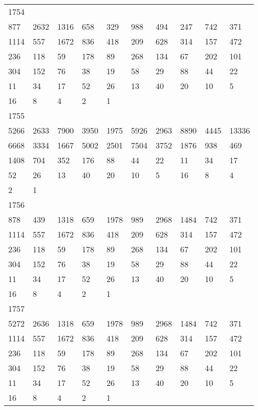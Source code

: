 \begin{longtable}{*{10}{l}}
1754&&&&&&&&&\\
877& 2632& 1316& 658& 329& 988& 494& 247& 742& 371\\
1114& 557& 1672& 836& 418& 209& 628& 314& 157& 472\\
236& 118& 59& 178& 89& 268& 134& 67& 202& 101\\
304& 152& 76& 38& 19& 58& 29& 88& 44& 22\\
11& 34& 17& 52& 26& 13& 40& 20& 10& 5\\
16& 8& 4& 2& 1& \\

1755&&&&&&&&&\\
5266& 2633& 7900& 3950& 1975& 5926& 2963& 8890& 4445& 13336\\
6668& 3334& 1667& 5002& 2501& 7504& 3752& 1876& 938& 469\\
1408& 704& 352& 176& 88& 44& 22& 11& 34& 17\\
52& 26& 13& 40& 20& 10& 5& 16& 8& 4\\
2& 1& \\

1756&&&&&&&&&\\
878& 439& 1318& 659& 1978& 989& 2968& 1484& 742& 371\\
1114& 557& 1672& 836& 418& 209& 628& 314& 157& 472\\
236& 118& 59& 178& 89& 268& 134& 67& 202& 101\\
304& 152& 76& 38& 19& 58& 29& 88& 44& 22\\
11& 34& 17& 52& 26& 13& 40& 20& 10& 5\\
16& 8& 4& 2& 1& \\

1757&&&&&&&&&\\
5272& 2636& 1318& 659& 1978& 989& 2968& 1484& 742& 371\\
1114& 557& 1672& 836& 418& 209& 628& 314& 157& 472\\
236& 118& 59& 178& 89& 268& 134& 67& 202& 101\\
304& 152& 76& 38& 19& 58& 29& 88& 44& 22\\
11& 34& 17& 52& 26& 13& 40& 20& 10& 5\\
16& 8& 4& 2& 1& \\


\end{longtable}
